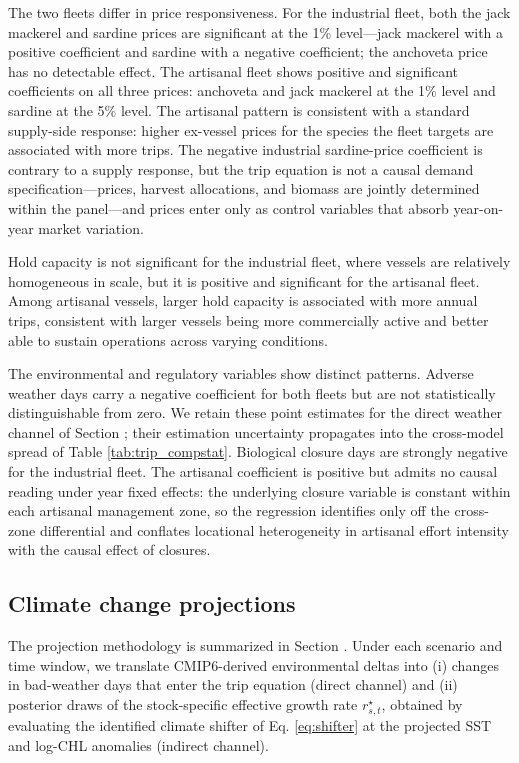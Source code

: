 \documentclass[
  11pt,
]{article}
\begin{document}
The two fleets differ in price responsiveness. For the industrial fleet, both the jack mackerel and sardine prices are significant at the 1\% level---jack mackerel with a positive coefficient and sardine with a negative coefficient; the anchoveta price has no detectable effect. The artisanal fleet shows positive and significant coefficients on all three prices: anchoveta and jack mackerel at the 1\% level and sardine at the 5\% level. The artisanal pattern is consistent with a standard supply-side response: higher ex-vessel prices for the species the fleet targets are associated with more trips. The negative industrial sardine-price coefficient is contrary to a supply response, but the trip equation is not a causal demand specification---prices, harvest allocations, and biomass are jointly determined within the panel---and prices enter only as control variables that absorb year-on-year market variation.

Hold capacity is not significant for the industrial fleet, where vessels are relatively homogeneous in scale, but it is positive and significant for the artisanal fleet. Among artisanal vessels, larger hold capacity is associated with more annual trips, consistent with larger vessels being more commercially active and better able to sustain operations across varying conditions.

The environmental and regulatory variables show distinct patterns. Adverse weather days carry a negative coefficient for both fleets but are not statistically distinguishable from zero. We retain these point estimates for the direct weather channel of Section \emph{}; their estimation uncertainty propagates into the cross-model spread of Table \ref{tab:trip_compstat}. Biological closure days are strongly negative for the industrial fleet. The artisanal coefficient is positive but admits no causal reading under year fixed effects: the underlying closure variable is constant within each artisanal management zone, so the regression identifies only off the cross-zone differential and conflates locational heterogeneity in artisanal effort intensity with the causal effect of closures.

\subsection{Climate change projections}\label{projections}

The projection methodology is summarized in Section \emph{}. Under each scenario and time window, we translate CMIP6-derived environmental deltas into (i) changes in bad-weather days that enter the trip equation (direct channel) and (ii) posterior draws of the stock-specific effective growth rate \(r_{s,t}^{\star}\), obtained by evaluating the identified climate shifter of Eq. \eqref{eq:shifter} at the projected SST and log-CHL anomalies (indirect channel).
\end{document}
